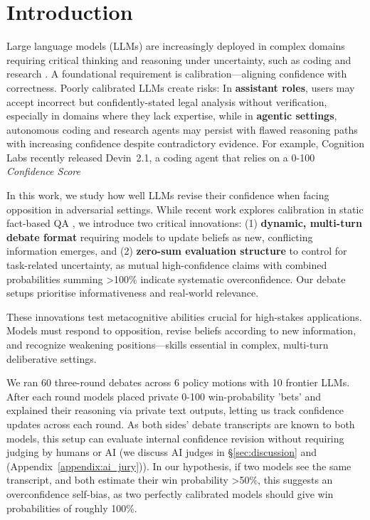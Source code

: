 \documentclass{article}
\begin{document}

\section{Introduction}

Large language models (LLMs) are increasingly deployed in complex domains requiring critical thinking and reasoning under uncertainty, such as coding and research \citep{handa2025economictasksperformedai, zheng2025deepresearcherscalingdeepresearch}. A foundational requirement is calibration—aligning confidence with correctness. Poorly calibrated LLMs create risks: In \textbf{assistant roles}, users may accept incorrect but confidently-stated legal analysis without verification, especially in domains where they lack expertise, while in \textbf{agentic settings}, autonomous coding and research agents may persist with flawed reasoning paths with increasing confidence despite contradictory evidence. For example, Cognition Labs recently released Devin~2.1, a coding agent that relies on a 0-100 \emph{Confidence Score} \citep{cognitionlabs_devin21_2025}

In this work, we study how well LLMs revise their confidence when facing opposition in adversarial settings. While recent work explores calibration in static fact-based QA \citep{tian2023justask, xiong2024uncertainty, kadavath2022know,groot-valdenegro-toro-2024-overconfidence}, we introduce two critical innovations:
(1) \textbf{dynamic, multi-turn debate format} requiring models to update beliefs as new, conflicting information emerges, and
(2) \textbf{zero-sum evaluation structure} to control for task-related uncertainty, as mutual high-confidence claims with combined probabilities summing >100\% indicate systematic overconfidence. Our debate setups prioritise informativeness and real-world relevance.

These innovations test metacognitive abilities crucial for high-stakes applications. Models must respond to opposition, revise beliefs according to new information, and recognize weakening positions—skills essential in complex, multi-turn deliberative settings.

We ran 60 three-round debates across 6 policy motions with 10 frontier LLMs. After each round models placed private 0-100 win-probability 'bets' and explained their reasoning via private text outputs, letting us track confidence updates across each round. As both sides' debate transcripts are known to both models, this setup can evaluate internal confidence revision without requiring judging by humans or AI (we discuss AI judges in \S\ref{sec:discussion} and (Appendix~\ref{appendix:ai_jury})). In our hypothesis, if two models see the same transcript, and both estimate their win probability >50\%, this suggests an overconfidence self-bias, as two perfectly calibrated models should give win probabilities of roughly 100\%.
\end{document}
